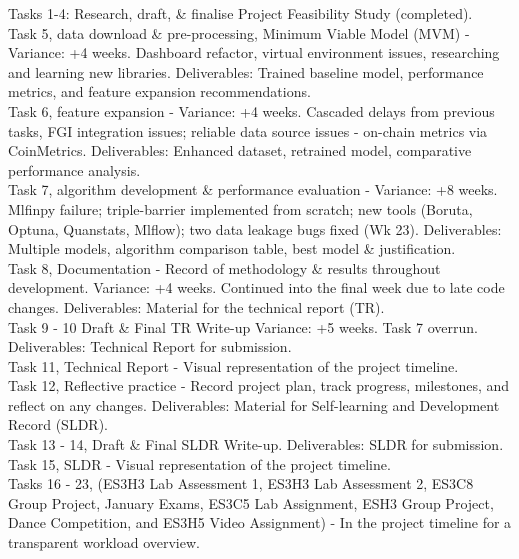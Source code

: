 \noindent Tasks 1-4: Research, draft, \& finalise Project Feasibility Study (completed).\\
Task 5, data download \& pre-processing, Minimum Viable Model (MVM) -
Variance: +4 weeks. Dashboard refactor, virtual environment issues, researching and learning new libraries.
Deliverables: Trained baseline model, performance metrics, and feature expansion recommendations.\\
Task 6, feature expansion -
Variance: +4 weeks. Cascaded delays from previous tasks, FGI integration issues; reliable data source issues - on-chain metrics via CoinMetrics.
Deliverables: Enhanced dataset, retrained model, comparative performance analysis.\\
Task 7, algorithm development \& performance evaluation -
Variance: +8 weeks. Mlfinpy failure; triple-barrier implemented from scratch; new tools (Boruta, Optuna, Quanstats, Mlflow); two data leakage bugs fixed (Wk 23).
Deliverables: Multiple models, algorithm comparison table, best model \& justification.\\
Task 8, Documentation - Record of methodology \& results throughout development.
Variance: +4 weeks. Continued into the final week due to late code changes.
Deliverables: Material for the technical report (TR).\\
Task 9 - 10 Draft \& Final TR Write-up
Variance: +5 weeks. Task 7 overrun.
Deliverables: Technical Report for submission.\\
Task 11, Technical Report - Visual representation of the project timeline.\\
Task 12, Reflective practice - Record project plan, track progress, milestones, and reflect on any changes.
Deliverables: Material for Self-learning and Development Record (SLDR).\\
Task 13 - 14, Draft \& Final SLDR Write-up.
Deliverables: SLDR for submission.\\
Task 15, SLDR - Visual representation of the project timeline.\\
Tasks 16 - 23, (ES3H3 Lab Assessment 1, ES3H3 Lab Assessment 2, ES3C8 Group Project, January Exams, ES3C5 Lab Assignment, ESH3 Group Project, Dance Competition, and ES3H5 Video Assignment) - In the project timeline for a transparent workload overview.

